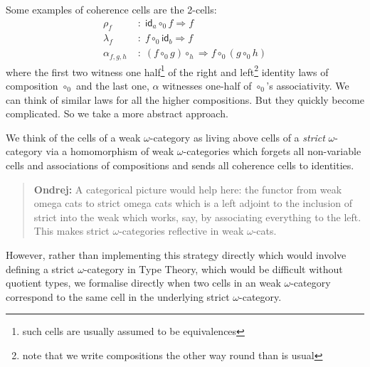 \documentclass[a4paper]{article}
\newcommand{\id}{\mathsf{id}}
\newenvironment{ondrej}{\begin{quote}\footnotesize \textbf{Ondrej:}}{\normalsize\end{quote}}
\begin{document}
Some examples of coherence cells are the 2-cells:
\begin{align*}
\rho_f &\;:\; \id_a \circ_0 f \Rightarrow f\\
\lambda_f & \; : \; f \circ_0 \id_b \Rightarrow f\\
\alpha_{f,g,h} & \; : \; (f \circ_0 g)\circ_h \Rightarrow f \circ_0 (g
\circ_0 h)
\end{align*}
where the first two witness one half\footnote{such cells are usually
  assumed to be equivalences} of the right and left\footnote{note that
  we write compositions the other way round than is usual} identity laws
of composition $\circ_0$ and the last one, $\alpha$ witnesses one-half
of $\circ_0$'s associativity. 
%
We can think of similar laws for all the higher compositions. But they
quickly become complicated. So we take a more abstract approach.

We think of the cells of a weak $\omega$-category as living above
cells of a \emph{strict} $\omega$-category via a homomorphism of weak
$\omega$-categories which forgets all non-variable cells and
associations of compositions and sends all coherence cells to
identities.
\begin{ondrej}
  A categorical picture would help here: the functor from weak omega
  cats to strict omega cats which is a left adjoint to the inclusion
  of strict into the weak which works, say, by associating everything to the
  left. This makes strict $\omega$-categories reflective in weak $\omega$-cats.
\end{ondrej}
However, rather than implementing this strategy directly which would
involve defining a strict $\omega$-category in Type Theory, which
would be difficult without quotient types, we formalise directly when
two cells in an weak $\omega$-category correspond to the same cell in
the underlying strict $\omega$-category.
%
%
\end{document}

